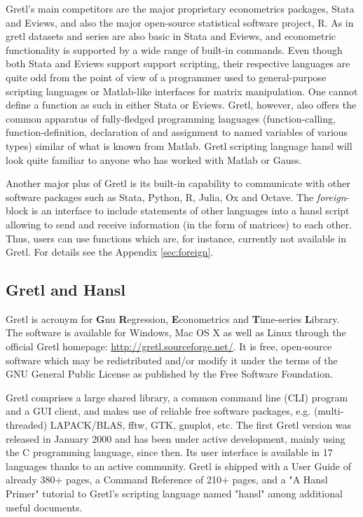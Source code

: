 \documentclass[11pt]{article}
\begin{document}
Gretl's main competitors are the major proprietary econometrics packages, Stata and Eviews, and also the major open-source statistical software project, R. As in gretl datasets and series are also basic in Stata and Eviews, and econometric functionality is supported by a wide range of built-in commands. Even though both Stata and Eviews support support scripting, their respective languages are quite odd from the point of view of a programmer used to general-purpose scripting languages or Matlab-like interfaces for matrix manipulation. One cannot define a function as
such in either Stata or Eviews. Gretl, however, also offers the common apparatus of fully-fledged programming languages (function-calling, function-definition, declaration of and assignment to named variables of various types) similar of what is known from Matlab. Gretl scripting language hansl will look quite familiar to anyone who has worked with Matlab or Gauss.

Another major plus of Gretl is its built-in capability to communicate with other software packages such as Stata, Python, R, Julia, Ox and Octave. The \textit{foreign}-block is an interface to include statements of other languages into a hansl script allowing to send and receive information (in the form of matrices) to each other. Thus, users can use functions which are, for instance, currently not available in Gretl.  For details see the Appendix \ref{sec:foreign}.

\subsection{Gretl and Hansl}
Gretl is acronym for \textbf{G}nu \textbf{R}egression, \textbf{E}conometrics and \textbf{T}ime-series \textbf{L}ibrary. The software is available for Windows, Mac OS X as well as Linux through the official Gretl homepage: \url{http://gretl.sourceforge.net/}. It is free, open-source software which may be redistributed and/or modify it under the terms of the GNU General Public License as published by the Free Software Foundation.

Gretl comprises a large shared library, a common command line (CLI) program and a GUI client, and makes use of reliable free software packages, e.g. (multi-threaded) LAPACK/BLAS, fftw, GTK, gnuplot, etc. The first Gretl version was released in January 2000 and has been under active development, mainly using the C programming language, since then. Its user interface is available in 17 languages thanks to an active community. Gretl is shipped with a User Guide of already 380+ pages, a Command Reference of 210+ pages, and a "A Hansl Primer" tutorial to Gretl's scripting language named "hansl" among additional useful documents.
\end{document}
